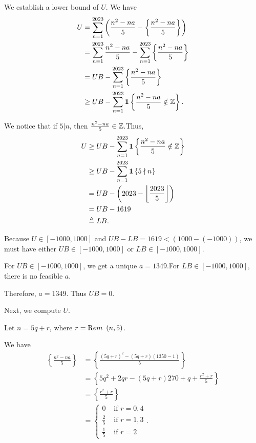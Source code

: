 \begin{enumerate}
{{ We establish a lower bound of $U$. We have
 \begin{align*} U & =  \sum_{n=1}^{2023} \left(  \frac{n^2 - na}{5} - \left\{ \frac{n^2 - na}{5} \right\}  \right) \\ & = \sum_{n=1}^{2023} \frac{n^2 - na}{5} - \sum_{n=1}^{2023} \left\{ \frac{n^2 - na}{5} \right\} \\ & = UB -  \sum_{n=1}^{2023} \left\{ \frac{n^2 - na}{5} \right\} \\ & \geq UB -  \sum_{n=1}^{2023} \mathbf 1 \left\{ \frac{n^2 - na}{5} \notin \Bbb Z \right\} . \end{align*}


 We notice that if $5 | n$, then $\frac{n^2 - na}{5} \in \Bbb Z$.Thus,
 \begin{align*} U & \geq UB -  \sum_{n=1}^{2023} \mathbf 1 \left\{ \frac{n^2 - na}{5} \notin \Bbb Z \right\} \\ & \geq UB -  \sum_{n=1}^{2023} \mathbf 1 \left\{ 5 \nmid n \right\} \\ & = UB - \left( 2023 - \left\lfloor \frac{2023}{5} \right\rfloor \right) \\ & = UB - 1619 \\ & \triangleq LB . \end{align*}


 Because $U \in \left[ - 1000, 1000 \right]$ and $UB - LB = 1619 < \left( 1000 - \left( - 1000 \right) \right)$, we must have either $UB \in \left[ - 1000, 1000 \right]$ or $LB \in \left[ - 1000, 1000 \right]$.

 For $UB \in \left[ - 1000, 1000 \right]$, we get a unique $a = 1349$.For $LB \in \left[ - 1000, 1000 \right]$, there is no feasible $a$.

 Therefore, $a = 1349$. Thus $UB = 0$.

 Next, we compute $U$.

 Let $n = 5 q + r$, where $r = {\textrm Rem} \ \left( n, 5 \right)$.

 We have
 \begin{align*} \left\{ \frac{n^2 - na}{5} \right\} & = \left\{ \frac{\left( 5 q + r \right)^2 - \left( 5 q + r \right)\left( 1350 - 1 \right)}{5} \right\} \\ & = \left\{ 5 q^2 + 2 q r - \left( 5 q + r \right) 270 + q + \frac{r^2 + r}{5}  \right\} \\ & = \left\{\frac{r^2 + r}{5}  \right\} \\ & = \left\{ \begin{array}{ll} 0 & \mbox{ if } r = 0, 4 \\ \frac{2}{5} & \mbox{ if } r = 1, 3 \\ \frac{1}{5} & \mbox{ if } r = 2 \end{array} \right. . \end{align*}


}}
\end{enumerate}
